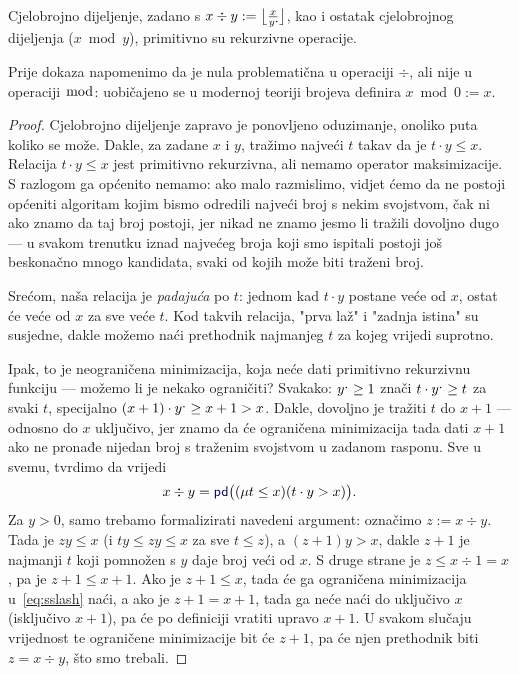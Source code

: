 \begin{propozicija}[{name=[primitivna rekurzivnost dijeljenja s ostatkom]}]\label{prop:divmodprn}
    Cjelobrojno dijeljenje, zadano s $x\div y:=\bigl\lfloor\frac{x}{y\sp{\text{\normalsize.}}\!}\bigr\rfloor$, kao i ostatak cjelobrojnog dijeljenja ($x\bmod y$), primitivno su rekurzivne operacije.
\end{propozicija}
Prije dokaza napomenimo da je nula problematična u operaciji $\div$, ali nije u operaciji $\bmod$: uobičajeno se u modernoj teoriji brojeva definira $x\bmod 0:=x$.
\begin{proof}
Cjelobrojno dijeljenje zapravo je ponovljeno oduzimanje, onoliko puta koliko se može. Dakle, za zadane $x$ i $y$, tražimo najveći $t$ takav da je $t\cdot y\le x$. Relacija $t\cdot y\le x$ jest primitivno rekurzivna, ali nemamo operator maksimizacije. S razlogom ga općenito nemamo: ako malo razmislimo, vidjet ćemo da ne postoji općeniti algoritam kojim bismo odredili najveći broj s nekim svojstvom, čak ni ako znamo da taj broj postoji, jer nikad ne znamo jesmo li tražili dovoljno dugo --- u svakom trenutku iznad najvećeg broja koji smo ispitali postoji još beskonačno mnogo kandidata, svaki od kojih može biti traženi broj.

Srećom, naša relacija je \emph{padajuća} po $t$: jednom kad $t\cdot y$ postane veće od $x$, ostat će veće od $x$ za sve veće $t$. Kod takvih relacija, "prva laž" i "zadnja istina" su susjedne, dakle možemo naći prethodnik najmanjeg $t$ za kojeg vrijedi suprotno.

Ipak, to je neograničena minimizacija, koja neće dati primitivno rekurzivnu funkciju --- možemo li je nekako ograničiti? Svakako: $y\sp{\text{\normalsize.}}\ge 1$ znači $t\cdot y\sp{\text{\normalsize.}}\ge t$ za svaki $t$, specijalno $(x+1)\cdot y\sp{\text{\normalsize.}}\ge x+1>x$. Dakle, dovoljno je tražiti $t$ do $x+1$ --- odnosno do $x$ uključivo, jer znamo da će ograničena minimizacija tada dati $x+1$ ako ne pronađe nijedan broj s traženim svojstvom u zadanom rasponu. Sve u svemu, tvrdimo da vrijedi
\begin{equation}\label{eq:sslash}
    x\div y=\f{pd}\bigl((\mu t\le x)(t\cdot y>x)\bigr)\text.
\end{equation}
Za $y>0$, samo trebamo formalizirati navedeni argument: označimo $z:=x\div y$. Tada je $zy\le x$ (i $ty\le zy\le x$ za sve $t\le z$), a $(z+1)y>x$, dakle $z+1$ je najmanji $t$ koji pomnožen s $y$ daje broj veći od $x$. S druge strane je $z\le x\div1=x$, pa je $z+1\le x+1$. Ako je $z+1\le x$, tada će ga ograničena minimizacija u~\eqref{eq:sslash} naći, a ako je $z+1=x+1$, tada ga neće naći do uključivo $x$ (isključivo $x+1$), pa će po definiciji vratiti upravo $x+1$. U svakom slučaju vrijednost te ograničene minimizacije bit će $z+1$, pa će njen prethodnik biti $z=x\div y$, što smo trebali.


\end{proof}

